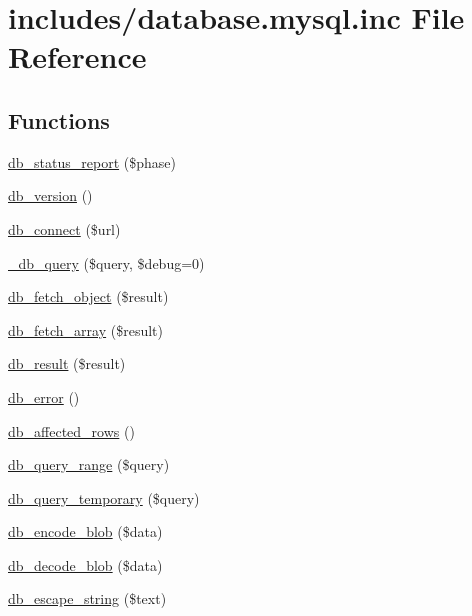 \hypertarget{database_8mysql_8inc}{
\section{includes/database.mysql.inc File Reference}
\label{database_8mysql_8inc}
}
\subsection*{Functions}
\begin{Indent}{\bf }\par
\begin{CompactItemize}
\item 
\hyperlink{database_8mysql_8inc_497d9afd8edb209108db34ea159c77ca}{db\_\-status\_\-report} (\$phase)
\item 
\hyperlink{database_8mysql_8inc_6736a6897048ff0167a0bbe5e374fc13}{db\_\-version} ()
\item 
\hyperlink{database_8mysql_8inc_bc9960ee403664deae1c219015dc5ff2}{db\_\-connect} (\$url)
\item 
\hyperlink{database_8mysql_8inc_f0a663e6a6aaf095f78a77c871b8028b}{\_\-db\_\-query} (\$query, \$debug=0)
\item 
\hyperlink{database_8mysql_8inc_5faaeba7105d28828db453b4fd3c75d4}{db\_\-fetch\_\-object} (\$result)
\item 
\hyperlink{database_8mysql_8inc_2bd5f98fec7f21ee2c37f6b83785dcb9}{db\_\-fetch\_\-array} (\$result)
\item 
\hyperlink{database_8mysql_8inc_953354ea01b236440b187210dc18aad9}{db\_\-result} (\$result)
\item 
\hyperlink{database_8mysql_8inc_5acae04a62f1baa2e83d189e72071bfe}{db\_\-error} ()
\item 
\hyperlink{database_8mysql_8inc_e3bc677fbeebd688068ce3b413ac2944}{db\_\-affected\_\-rows} ()
\item 
\hyperlink{database_8mysql_8inc_893cbcab2ecf321005eae4e278adc22b}{db\_\-query\_\-range} (\$query)
\item 
\hyperlink{database_8mysql_8inc_bce8dcddcded20016a1925824cd09efa}{db\_\-query\_\-temporary} (\$query)
\item 
\hyperlink{database_8mysql_8inc_464ab7b26ecfdddc68f3564ca609ac3f}{db\_\-encode\_\-blob} (\$data)
\item 
\hyperlink{database_8mysql_8inc_1ed4215d202290ca055de8f6cf3b6f08}{db\_\-decode\_\-blob} (\$data)
\item 
\hyperlink{database_8mysql_8inc_f7e6977f59f6a23327521ae3a89346f5}{db\_\-escape\_\-string} (\$text)

\end{CompactItemize}
\end{Indent}
